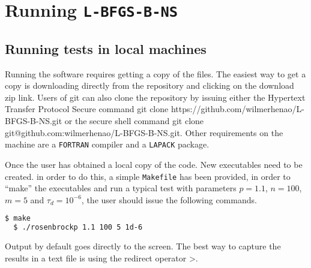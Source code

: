 
\chapter{Running \texttt{L-BFGS-B-NS}} %

\label{AppendixA} %



\section{Running tests in local machines}

Running the software requires getting a copy of the files. The easiest way to get a copy is downloading directly from the repository \citep{lbfgsbNS} and clicking on the \textup{download zip} link. Users of git can also clone the repository by issuing either the Hypertext Transfer Protocol Secure command \textup{git clone https://github.com/wilmerhenao/L-BFGS-B-NS.git} or the secure shell command \textup{git clone git@github.com:wilmerhenao/L-BFGS-B-NS.git}. Other requirements on the machine are a \texttt{FORTRAN} compiler and a \texttt{LAPACK} package.

Once the user has obtained a local copy of the code. New executables need to be created. in order to do this, a simple \texttt{Makefile} has been provided, in order to ``make'' the executables and run a typical test with parameters $p = 1.1$, $n = 100$, $m = 5$ and $\tau_d = 10^{-6}$, the user should issue the following commands.

\begin{lstlisting}[language=bash]
  $ make
  $ ./rosenbrockp 1.1 100 5 1d-6
\end{lstlisting}

Output by default goes directly to the screen. The best way to capture the results in a text file is using the redirect operator >.

